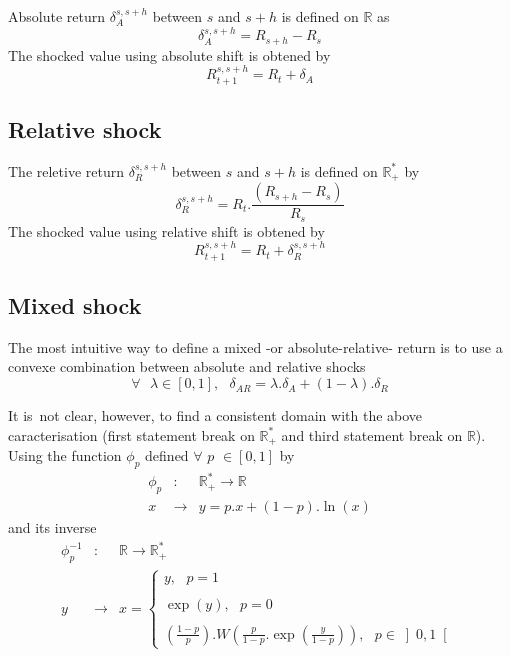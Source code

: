 \documentclass[3pt]{article}
\begin{document}
Absolute return $\delta _{A}^{s,s+h}$ between $s$ and $s+h$ is defined on $%
\mathbb{R}$ as%
\begin{equation*}
\delta _{A}^{s,s+h}=R_{s+h}-R_{s}
\end{equation*}%
The shocked value using absolute shift is obtened by 
\begin{equation*}
R_{t+1}^{s,s+h}=R_{t}+\delta _{A}
\end{equation*}

\subsection{Relative shock}

The reletive return $\delta _{R}^{s,s+h}$ between $s$ and $s+h$ is defined
on $\mathbb{R}_{+}^{\ast }$ by%
\begin{equation*}
\delta _{R}^{s,s+h}=R_{t}.\frac{\left( R_{s+h}-R_{s}\right) }{R_{s}}
\end{equation*}%
The shocked value using relative shift is obtened by 
\begin{equation*}
R_{t+1}^{s,s+h}=R_{t}+\delta _{R}^{s,s+h}
\end{equation*}

\subsection{Mixed shock}

The most intuitive way to define a mixed -or absolute-relative- return is to
use a convexe combination between absolute and relative shocks 
\begin{equation*}
\forall \text{ }\lambda \in \left[ 0,1\right] ,\text{ \ \ }\delta
_{AR}=\lambda .\delta _{A}+(1-\lambda ).\delta _{R}
\end{equation*}

It is\ not clear, however, to find a consistent domain with the above
caracterisation (first statement break on $\mathbb{R}_{+}^{\ast }$ and third
statement break on $\mathbb{R}$). Using the function $\phi _{p}$ defined $%
\forall $ $p$ $\in \left[ 0,1\right] $ by%
\begin{eqnarray*}
\phi _{p} &:&\mathbb{R}_{+}^{\ast }\rightarrow \mathbb{R} \\
x &\rightarrow &y=p.x+(1-p).\ln (x)
\end{eqnarray*}%
and its inverse 
\begin{eqnarray*}
\phi _{p}^{-1} &:&\mathbb{R}\rightarrow \mathbb{R}_{+}^{\ast } \\
y &\rightarrow &x=\left\{ 
\begin{array}{c}
y,\text{ \ \ \ \ \ \ \ \ \ \ \ \ \ \ \ \ \ \ \ \ \ \ \ \ \ \ \ \ \ \ \ \ }p=1
\\ 
\\ 
\exp (y),\text{ \ \ \ \ \ \ \ \ \ \ \ \ \ \ \ \ \ \ \ \ \ \ \ \ \ }p=0 \\ 
\\ 
\left( \frac{1-p}{p}\right) .W\left( \frac{p}{1-p}.\exp \left( \frac{y}{1-p}%
\right) \right) ,\text{ }p\in \left] 0,1\right[%
\end{array}%
\right.
\end{eqnarray*}
\end{document}
